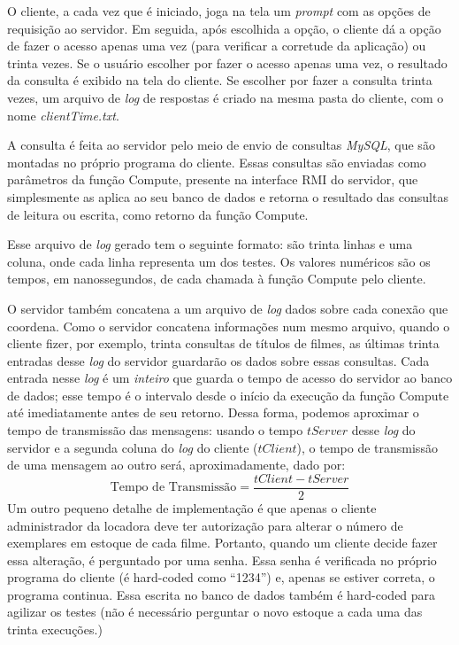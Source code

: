 \documentclass[12pt,a4paper]{article}
\begin{document}
O cliente, a cada vez que é iniciado, joga na tela um {\it prompt} com as opções de requisição ao servidor. Em seguida, após escolhida a opção, o cliente dá a opção de fazer o acesso apenas uma vez (para verificar a corretude da aplicação) ou trinta vezes. Se o usuário escolher por fazer o acesso apenas uma vez, o resultado da consulta é exibido na tela do cliente. Se escolher por fazer a consulta trinta vezes, um arquivo de {\it log} de respostas é criado na mesma pasta do cliente, com o nome {\it clientTime.txt}.

A consulta é feita ao servidor pelo meio de envio de consultas {\it MySQL}, que são montadas no próprio programa do cliente. Essas consultas são enviadas como parâmetros da função Compute, presente na interface RMI do servidor, que simplesmente as aplica ao seu banco de dados e retorna o resultado das consultas de leitura ou escrita, como retorno da função Compute.

Esse arquivo de {\it log} gerado tem o seguinte formato: são trinta linhas e uma coluna, onde cada linha representa um dos testes. Os valores numéricos são os tempos, em nanossegundos, de cada chamada à função Compute pelo cliente.

O servidor também concatena a um arquivo de {\it log} dados sobre cada conexão que coordena. Como o servidor concatena informações num mesmo arquivo, quando o cliente fizer, por exemplo, trinta consultas de títulos de filmes, as últimas trinta entradas desse {\it log} do servidor guardarão os dados sobre essas consultas. Cada entrada nesse {\it log} é um {\it inteiro} que guarda o tempo de acesso do servidor ao banco de dados; esse tempo é o intervalo desde o início da execução da função Compute até imediatamente antes de seu retorno. Dessa forma, podemos aproximar o tempo de transmissão das mensagens: usando o tempo $ tServer $ desse {\it log} do servidor e a segunda coluna do {\it log} do cliente ($ tClient $), o tempo de transmissão de uma mensagem ao outro será, aproximadamente, dado por:
\begin{equation}
{\text {Tempo de Transmissão}} = \frac{tClient - tServer}{2}
\label{eqn:time}
\end{equation}
Um outro pequeno detalhe de implementação é que apenas o cliente administrador da locadora deve ter autorização para alterar o número de exemplares em estoque de cada filme. Portanto, quando um cliente decide fazer essa alteração, é perguntado por uma senha. Essa senha é verificada no próprio programa do cliente (é hard-coded como “1234”) e, apenas se estiver correta, o programa continua. Essa escrita no banco de dados também é hard-coded para agilizar os testes (não é necessário perguntar o novo estoque a cada uma das trinta execuções.)
\end{document}
